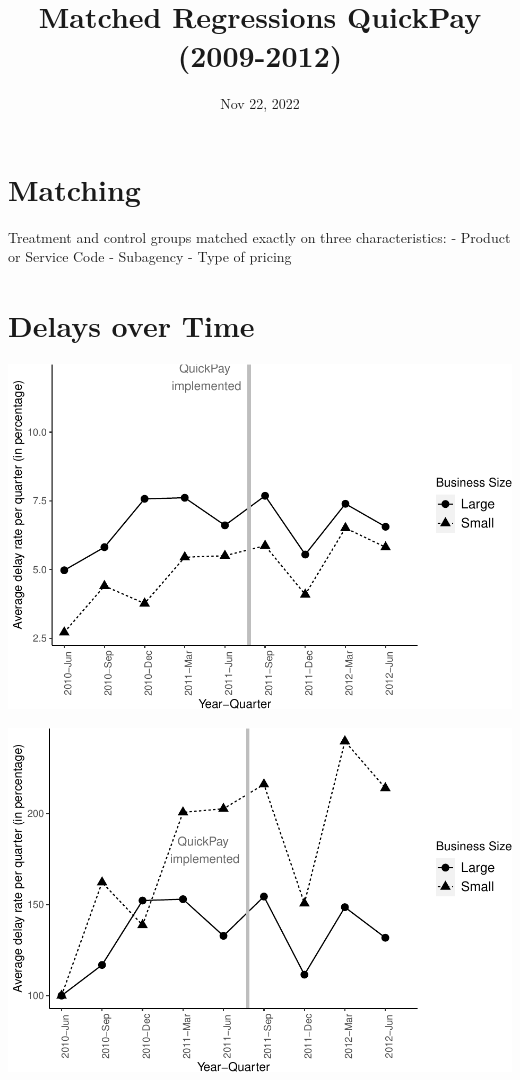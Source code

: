 \documentclass[
]{article}
\title{Matched Regressions QuickPay (2009-2012)}
\author{}
\date{\vspace{-2.5em}Nov 22, 2022}
\begin{document}
\maketitle

\hypertarget{matching}{%
\section{Matching}\label{matching}}

Treatment and control groups matched exactly on three characteristics: -
Product or Service Code - Subagency - Type of pricing

\hypertarget{delays-over-time}{%
\section{Delays over Time}\label{delays-over-time}}

\includegraphics{qp_first_matched_files/figure-latex/plot-1.pdf}

\includegraphics{qp_first_matched_files/figure-latex/normalized_plot-1.pdf}
\end{document}
